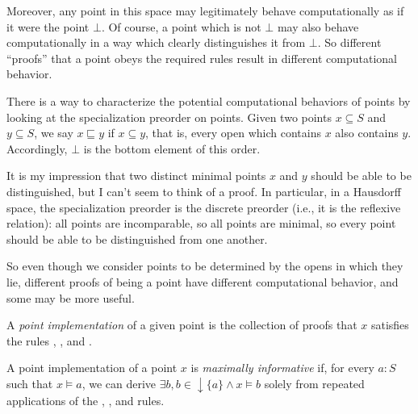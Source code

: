 Moreover, any point in this space may legitimately behave computationally as if it were the point $\bot$. Of course, a point which is not $\bot$ may also behave computationally in a way which clearly distinguishes it from $\bot$. So different ``proofs'' that a point obeys the required rules result in different computational behavior.

There is a way to characterize the potential computational behaviors of points by looking at the specialization preorder on points. Given two points $x \subseteq S$ and $y \subseteq S$, we say $x \sqsubseteq y$ if $x \subseteq y$, that is, every open which contains $x$ also contains $y$. Accordingly, $\bot$ is the bottom element of this order.

It is my impression that two distinct minimal points $x$ and $y$ should be able to be distinguished, but I can't seem to think of a proof. In particular, in a Hausdorff space, the specialization preorder is the discrete preorder (i.e., it is the reflexive relation): all points are incomparable, so all points are minimal, so every point should be able to be distinguished from one another.

So even though we consider points to be determined by the opens in which they lie, different proofs of being a point have different computational behavior, and some may be more useful.

\begin{definition} A \emph{point implementation} of a given point is the collection of proofs that $x$ satisfies the rules , , and .
\end{definition}

\begin{definition}
A point implementation of a point $x$ is \emph{maximally informative} if, for every $a : S$ such that $x \models a$, we can derive $\exists b, b \in \downarrow \{ a \} \wedge x \models b$ solely from repeated applications of the , , and  rules.
\end{definition}

